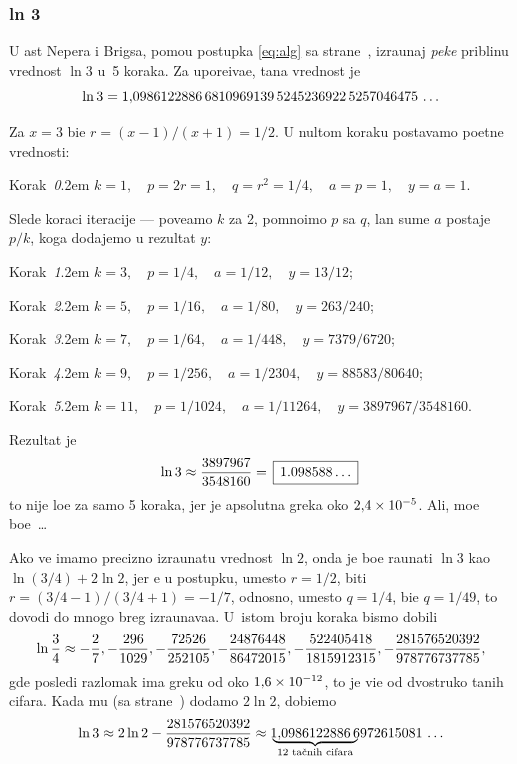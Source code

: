 \subsubsection{ln 3}\label{sssec:ln3}
 
\zadatak
U {\cv}ast Nepera i Brigsa,
pomo{\cc}u postupka \eqref{eq:alg} sa 
strane~\pageref{eq:alg},
izra{\cv}unaj {\sl pe{\sv}ke\/} pribli{\zv}nu vrednost $\ln 3$
u~5 koraka. Za upore{\dj}iva{\nj}e, ta{\cv}na vrednost je
$$
\ln3=1\.
0986122886\,
6810969139\,
5245236922\,
5257046475\,\ldots
$$

\def\step#1{\par\indent\leavevmode
  Korak~{\it#1}.\kern2em\relax}

\resenje
Za $x=3$ bi{\cc}e $r=(x-1)/(x+1)=1/2$. U nultom koraku postav{\lj}amo po{\cv}etne vrednosti:

\smallskip

\step0 $k=1,\quad p=2r=1,\quad q=r^2=1/4,\quad a=p=1,\quad y=a=1$.

\smallskip

\noindent Slede koraci iteracije --- pove{\cc}amo $k$ za 2, pomno{\zv}imo $p$ sa $q$,
{\cv}lan sume $a$ postaje $p/k$, koga dodajemo u rezultat $y$:

\smallskip

\step1 $k=3,\quad p=1/4,\quad a=1/12,\quad y=13/12$;
\step2 $k=5,\quad p=1/16,\quad a=1/80,\quad y=263/240$;
\step3 $k=7,\quad p=1/64,\quad a=1/448,\quad y=7379/6720$;
\step4 $k=9,\quad p=1/256,\quad a=1/2304,\quad y=88583/80640$;
\step5 $k=11,\quad p=1/1024,\quad a=1/11264,\quad y=3897967/3548160$.

\smallskip

\noindent Rezultat je
$$
\ln3\approx\frac{3897967}{3548160}=
\ram{1.098588\ldots} 
$$
{\sv}to nije lo{\sv}e za samo 5 koraka, jer je apsolutna gre{\sv}ka oko $2\.4\puta10^{-5}$.
Ali, mo{\zv}e bo{\lj}e~\dots

\dodatak
Ako ve{\cc} imamo precizno izra{\cv}unatu vrednost $\ln2$, onda je bo{\lj}e ra{\cv}unati $\ln3$ kao $\ln(3/4)+2\ln2$,
jer {\cc}e u postupku, umesto $r=1/2$, biti $r=(3/4-1)/(3/4+1)=-1/7$, 
odnosno, umesto $q=1/4$, bi{\cc}e $q=1/49$,
{\sv}to dovodi do mnogo br{\zv}eg izra{\cv}unava{\nj}a. U~istom broju koraka bismo dobili
$$
\ln\frac34\approx
-\ff2/7, -\ff296/1029, -\ff72526/252105, -\ff24876448/86472015, 
-\ff522405418/1815912315, -\ff281576520392/978776737785,
$$
gde posled{\nj}i razlomak ima gre{\sv}ku od oko $1\.6\puta10^{-12}$,
{\sv}to je vi{\sv}e od dvostruko ta{\cv}nih cifara.
Kada mu (sa strane~\pageref{eq:ln2}) dodamo $2\ln2$, dobi{\cc}emo
$$\ln3\approx 2\ln2 -\frac{281576520392}{978776737785} \approx
{\,\underbrace{\!1\.0986122886\,6\!}_{\hbox{\scriptsize 12 ta{\cv}nih cifara}}972615081\,\ldots}
$$

